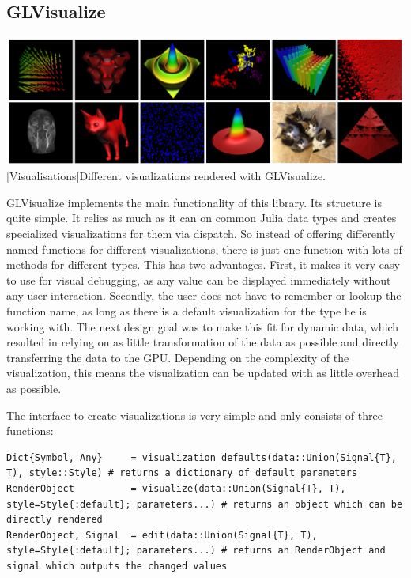 \subsection{GLVisualize}

\vspace{1em}
\begin{minipage}{\linewidth}
    \centering
    \includegraphics[width=0.9\linewidth]{graphics/glvisualize.jpg}
    [Visualisations]{Different visualizations rendered with GLVisualize.}
    \label{fig:glvisualize}
\end{minipage}

GLVisualize implements the main functionality of this library.
Its structure is quite simple. 
It relies as much as it can on common Julia data types and creates specialized visualizations for them via dispatch.
So instead of offering differently named functions for different visualizations, there is just one function with lots of methods for different types.
This has two advantages.
First, it makes it very easy to use for visual debugging, as any value can be displayed immediately without any user interaction.
Secondly, the user does not have to remember or lookup the function name, as long as there is a default visualization for the type he is working with.
The next design goal was to make this fit for dynamic data, which resulted in relying on as little transformation of the data as possible and directly transferring the data to the GPU.
Depending on the complexity of the visualization, this means the visualization can be updated with as little overhead as possible.

The interface to create visualizations is very simple and only consists of three functions:
\begin{lstlisting}
Dict{Symbol, Any}     = visualization_defaults(data::Union(Signal{T}, T), style::Style) # returns a dictionary of default parameters
RenderObject          = visualize(data::Union(Signal{T}, T), style=Style{:default}; parameters...) # returns an object which can be directly rendered
RenderObject, Signal  = edit(data::Union(Signal{T}, T), style=Style{:default}; parameters...) # returns an RenderObject and signal which outputs the changed values
\end{lstlisting}


